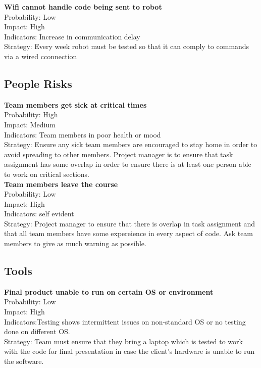 			\textbf{Wifi cannot handle code being sent to robot}\\
			Probability: Low\\
			Impact: High\\
			Indicators: Increase in communication delay\\
			Strategy: Every week robot must be tested so that it can comply to commands via a wired cconnection

			\subsection*{People Risks}
			\textbf{Team members get sick at critical times}\\
			Probability: High\\
			Impact: Medium\\
			Indicators: Team members in poor health or mood\\
			Strategy: Ensure any sick team members are encouraged to stay home in order to avoid spreading to other members. Project manager is to ensure that task assignment has some overlap in order to ensure there is at least one person able to work on critical sections.\\
			
			\textbf{Team members leave the course}\\
			Probability: Low\\
			Impact: High\\
			Indicators: self evident\\
			Strategy: Project manager to ensure that there is overlap in task assignment and that all team members have some expereience in every aspect of code. Ask team members to give as much warning as possible.\\

			\subsection*{Tools}

			\textbf{Final product unable to run on certain OS or environment}\\
			Probability: Low\\
			Impact: High\\
			Indicators:Testing shows intermittent issues on non-standard OS or no testing done on different OS.\\
			Strategy: Team must ensure that they bring a laptop which is tested to work with the code for final presentation in case the client's hardware is unable to run the software.\\

